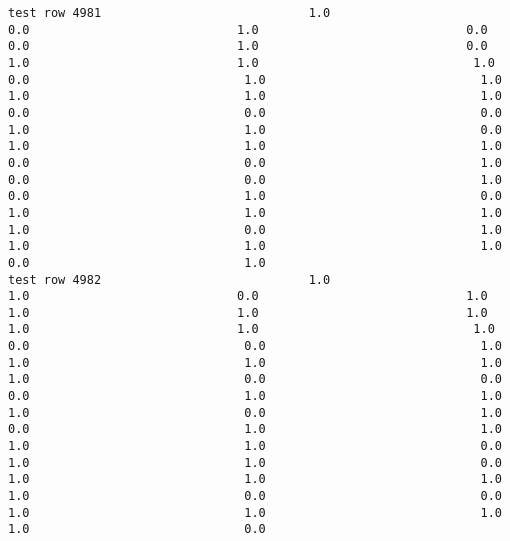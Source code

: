 \documentclass[11pt]{article}
\begin{document}
\begin{verbatim}
test row 4981                             1.0                             0.0                             1.0                             0.0                             0.0                             1.0                             0.0                             1.0                             1.0                              1.0                              0.0                              1.0                              1.0                              1.0                              1.0                              1.0                              0.0                              0.0                              0.0                              1.0                              1.0                              0.0                              1.0                              1.0                              1.0                              0.0                              0.0                              1.0                              0.0                              0.0                              1.0                              0.0                              1.0                              0.0                              1.0                              1.0                              1.0                              1.0                              0.0                              1.0                              1.0                              1.0                              1.0                              0.0                              1.0
test row 4982                             1.0                             1.0                             0.0                             1.0                             1.0                             1.0                             1.0                             1.0                             1.0                              1.0                              0.0                              0.0                              1.0                              1.0                              1.0                              1.0                              1.0                              0.0                              0.0                              0.0                              1.0                              1.0                              1.0                              0.0                              1.0                              0.0                              1.0                              1.0                              1.0                              1.0                              0.0                              1.0                              1.0                              0.0                              1.0                              1.0                              1.0                              1.0                              0.0                              0.0                              1.0                              1.0                              1.0                              1.0                              0.0

\end{verbatim}
\end{document}
